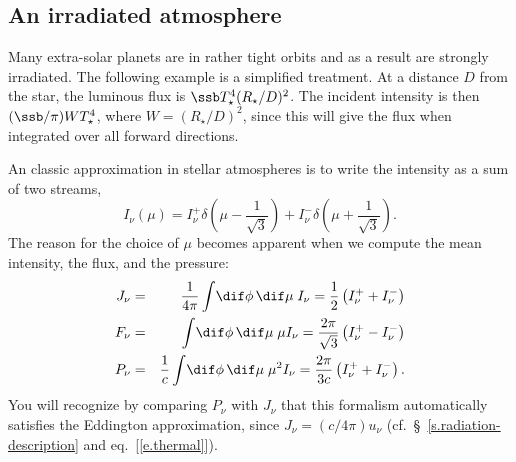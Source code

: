 \subsection{An irradiated atmosphere}\label{s.two-stream}

Many extra-solar planets are in rather tight orbits and as a result are strongly irradiated.  The following example is a simplified treatment\cite{Hummer1982The-effect-of-r,Hubeny2003A-Possible-Bifu}. At a distance $D$ from the star, the luminous flux is $\ssb T_{\star}^{4}(R_{\star}/D)^{2}$. The incident intensity is then $(\ssb/\pi)WT_{\star}^{4}$, where $W = (R_{\star}/D)^{2}$, since this will give the flux when integrated over all forward directions. 

An classic approximation in stellar atmospheres is to write the intensity as a sum of two streams,
\begin{equation}\label{e.two-stream}
I_{\nu}(\mu) = I_{\nu}^{+}\delta\left(\mu-\frac{1}{\sqrt{3}}\right) + I_{\nu}^{-}\delta\left(\mu + \frac{1}{\sqrt{3}}\right).
\end{equation}
The reason for the choice of $\mu$ becomes apparent when we compute the mean intensity, the flux, and the pressure:
\begin{eqnarray*}
J_{\nu} &=& \frac{1}{4\pi}\int\!\dif\phi\,\dif\mu\; I_{\nu} = \frac{1}{2}\left(I_{\nu}^{+} + I_{\nu}^{-}\right)\\
F_{\nu} &=& \int\!\dif\phi\,\dif\mu\;\mu I_{\nu} = \frac{2\pi}{\sqrt{3}} \left( I_{\nu}^{+} - I_{\nu}^{-}\right)\\
P_{\nu} &=& \frac{1}{c} \int\!\dif\phi\,\dif\mu\;\mu^{2} I_{\nu} = \frac{2\pi}{3c}\left(I_{\nu}^{+} + I_{\nu}^{-}\right).\\
\end{eqnarray*}
You will recognize by comparing $P_{\nu}$ with $J_{\nu}$ that this formalism automatically satisfies the Eddington approximation, since $J_{\nu} = (c/4\pi)u_{\nu}$ (cf.\ \S~\ref{s.radiation-description} and eq.~[\ref{e.thermal}]).

